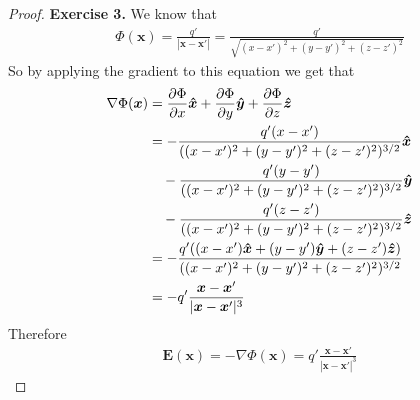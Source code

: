 \documentclass[11pt]{article}
\newcommand{\hatx}{\bm{\hat{x}}}
\newcommand{\haty}{\bm{\hat{y}}}
\newcommand{\hatz}{\bm{\hat{z}}}
\newcommand{\vecx}{\bm{x}}
\theoremstyle{definition}
\begin{document}
\cleardoublepage
\begin{proof}{\textbf{Exercise 3.}}
    We know that
    \begin{align*}
        \Phi(\vecx) = \frac{q'}{|\vecx - \vecx'|}
        = \frac{q'}{\sqrt{(x -x')^2 + (y -y')^2 + (z -z')^2}}
    \end{align*}
    So by applying the gradient to this equation we get that
    \begin{align*}
        \nabla\Phi(\vecx)
        &= \partialderivative{\Phi}{x}\hatx 
        + \partialderivative{\Phi}{y}\haty + \partialderivative{\Phi}{z}\hatz\\
        &= -\frac{q'(x- x')}{((x -x')^2 + (y -y')^2 + (z -z')^2)^{3/2}}\hatx\\
        &\quad -\frac{q'(y - y')}{((x -x')^2 + (y -y')^2 + (z -z')^2)^{3/2}}\haty\\
        &\quad -\frac{q'(z - z')}{((x -x')^2 + (y -y')^2 + (z -z')^2)^{3/2}}\hatz\\
        &= -\frac{q'((x -x')\hatx + (y -y')\haty + (z -z')\hatz)}
        {((x -x')^2 + (y -y')^2 + (z -z')^2)^{3/2}}\\
        &= -q'\frac{\vecx - \vecx'}{|\vecx - \vecx'|^3}
    \end{align*}
    Therefore
    \begin{align*}
        \bm{E}(\vecx) = -\nabla\Phi(\vecx)
        = q'\frac{\vecx - \vecx'}{|\vecx - \vecx'|^3}
    \end{align*}


\end{proof}
\end{document}
